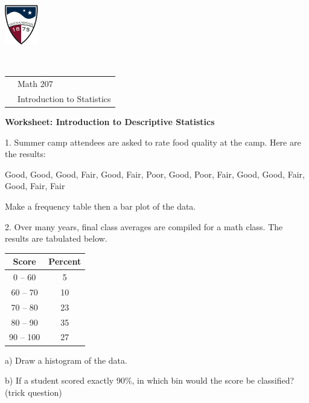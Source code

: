 \documentclass[10pt]{article}
\newcommand{\z}{\hphantom{0}}
\begin{document}
\pagestyle{empty}

\href{http://www.su.edu}{\includegraphics[height=1.75cm]{sulogo.eps}}
\vspace{-1.69cm}

{\small{\ }\hfill
\begin{tabular}{cl}
& Math 207\\& Introduction to Statistics\\
\end{tabular}
}
\setlength{\baselineskip}{1.05\baselineskip}
\medskip

{\setlength{\baselineskip}{1.05\baselineskip}
\begin{center}
\textbf{\large  Worksheet:  Introduction to Descriptive Statistics}
\end{center}


1. Summer camp attendees are asked to rate food quality at the camp.  Here are the results:\vspace{-3pt}
\begin{center}
Good, Good, Good, Fair, Good, Fair, Poor, Good, Poor, Fair, Good, Good, Fair, Good, Fair, Fair\vspace{-4pt}
\end{center}
Make a frequency table then a bar plot of the data.  
\vspace{2.5in}

2. Over many years, final class averages are compiled for a math class.  The results are tabulated below.

\begin{tabular}{|cc|}\hline
Score  & Percent\vphantom{\LARGE V}\\\hline
\z0 -- 60  & \z5\vphantom{\LARGE Y}\\
60 -- 70 & 10\\
70 -- 80 & 23\\
80 -- 90 & 35\\
\z90 -- 100 & 27\\\hline
\end{tabular}

\hspace{10pt} a) Draw a histogram of the data.
\vspace{.5in}

\hspace{10pt} b) If a student scored exactly 90\%, in which bin would the score be classified?  (trick question)
\vspace{.4in}

}
\end{document}
